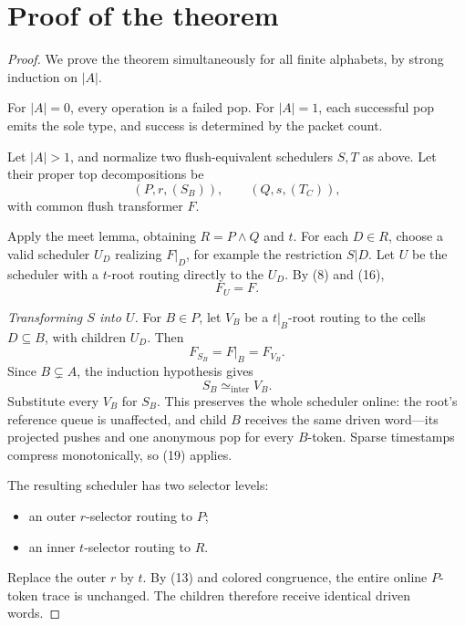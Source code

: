 \documentclass{amsart}
\theoremstyle{plain}
\theoremstyle{definition}
\begin{document}
\section{Proof of the theorem}

\begin{proof}
We prove the theorem simultaneously for all finite alphabets, by strong induction on $|A|$.

For $|A|=0$, every operation is a failed pop. For $|A|=1$, each successful pop emits the sole type, and success is determined by the packet count.

Let $|A|>1$, and normalize two flush-equivalent schedulers $S,T$ as above. Let their proper top decompositions be
\[
(P,r,(S_B)),\qquad (Q,s,(T_C)),
\]
with common flush transformer $F$.

Apply the meet lemma, obtaining $R=P\wedge Q$ and $t$. For each $D\in R$, choose a valid scheduler $U_D$ realizing $F|_D$, for example the restriction $S|D$. Let $U$ be the scheduler with a $t$-root routing directly to the $U_D$. By (8) and (16),
\begin{equation*}
F_U=F. \tag{17}
\end{equation*}

\smallskip\noindent\textit{Transforming $S$ into $U$.} For $B\in P$, let $V_B$ be a $t|_B$-root routing to the cells $D\subseteq B$, with children $U_D$. Then
\begin{equation*}
F_{S_B}=F|_B=F_{V_B}. \tag{18}
\end{equation*}
Since $B\subsetneq A$, the induction hypothesis gives
\begin{equation*}
S_B\simeq_{\mathrm{inter}}V_B. \tag{19}
\end{equation*}
Substitute every $V_B$ for $S_B$. This preserves the whole scheduler online: the root's reference queue is unaffected, and child $B$ receives the same driven word---its projected pushes and one anonymous pop for every $B$-token. Sparse timestamps compress monotonically, so (19) applies.

The resulting scheduler has two selector levels:
\begin{itemize}
\item an outer $r$-selector routing to $P$;
\item an inner $t$-selector routing to $R$.
\end{itemize}
Replace the outer $r$ by $t$. By (13) and colored congruence, the entire online $P$-token trace is unchanged. The children therefore receive identical driven words.


\end{proof}
\end{document}
